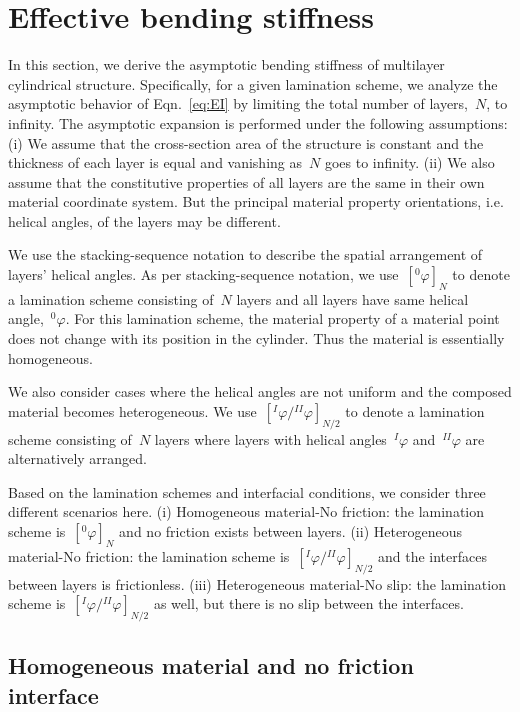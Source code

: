 \documentclass[preprint,12pt,times,draft]{elsarticle}
\numberwithin{equation}{section}
\renewcommand{\>}{$\Rightarrow$}
\begin{document}
\section{Effective bending stiffness}
\label{sec:limit_analysis}
In this section, we derive the asymptotic bending stiffness of multilayer cylindrical structure.
Specifically, for a given lamination scheme, we analyze the asymptotic behavior of Eqn.~\eqref{eq:EI} by limiting the total number of layers,~$N$, to infinity.
The asymptotic expansion is performed under the following assumptions: (i) We assume that the cross-section area of the structure is constant and the thickness of each layer is equal and vanishing as~$N$ goes to infinity. (ii) We also assume that the constitutive properties of all layers are the same in their own material coordinate system. But the principal material property orientations, i.e. helical angles, of the layers may be different.

We use the stacking-sequence notation to describe the spatial arrangement of layers' helical angles. As per stacking-sequence notation, we use~$[{}^{0}\!\varphi]_N$ to denote a lamination scheme consisting of~$N$ layers and all layers have same helical angle,~${}^{0}\!\varphi$.
For this lamination scheme, the material property of a material point does not change with its position in the cylinder. Thus the material is essentially homogeneous.


We also consider cases where the helical angles are not uniform and the composed material becomes heterogeneous. We use~$[{}^{I}\!\varphi/{}^{II}\!\varphi]_{N/2}$ to denote a lamination scheme consisting of~$N$ layers where layers with helical angles~${}^{I}\!\varphi$ and~${}^{II}\!\varphi$ are alternatively arranged.

Based on the lamination schemes and interfacial conditions, we consider three different scenarios here. (i) Homogeneous material-No friction: the lamination scheme is~$[{}^{0}\!\varphi]_N$ and no friction exists between layers. (ii) Heterogeneous material-No friction: the lamination scheme is~$[{}^{I}\!\varphi/{}^{II}\!\varphi]_{N/2}$ and the interfaces between layers is frictionless. (iii) Heterogeneous material-No slip: the lamination scheme is~$[{}^{I}\!\varphi/{}^{II}\!\varphi]_{N/2}$ as well, but there is no slip between the interfaces.

\subsection{Homogeneous material and no friction interface}
\label{sec:1mat_no_friction}
\end{document}

